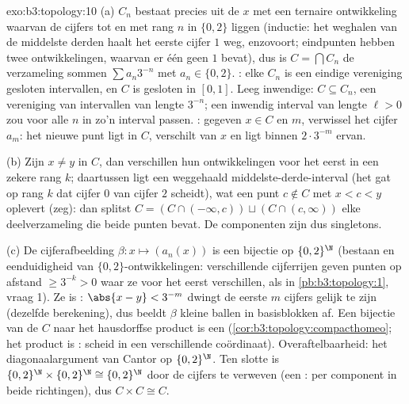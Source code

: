 \begin{solution}{exo:b3:topology:10}
(a) $C_n$ bestaat precies uit de $x$ met een ternaire ontwikkeling
waarvan de cijfers tot en met rang $n$ in $\{0, 2\}$ liggen
(inductie: het weghalen van de middelste derden haalt het eerste
cijfer $1$ weg, enzovoort; eindpunten hebben twee ontwikkelingen,
waarvan er één geen $1$ bevat), dus is $C = \bigcap C_n$ de
verzameling sommen $\sum a_n3^{-n}$ met $a_n \in \{0,2\}$.
: elke $C_n$ is een eindige vereniging gesloten
intervallen, en $C$ is gesloten in $[0,1]$. Leeg inwendige: $C
\subseteq C_n$, een vereniging van intervallen van lengte
$3^{-n}$; een inwendig interval van lengte $\ell > 0$ zou voor
alle $n$ in zo'n interval passen. : gegeven $x \in C$ en
$m$, verwissel het cijfer $a_m$: het nieuwe punt ligt in $C$,
verschilt van $x$ en ligt binnen $2\cdot3^{-m}$ ervan.

(b) Zijn $x \neq y$ in $C$, dan verschillen hun ontwikkelingen
voor het eerst in een zekere rang $k$; daartussen ligt een
weggehaald middelste-derde-interval (het gat op rang $k$ dat
cijfer $0$ van cijfer $2$ scheidt), wat een punt $c \notin C$ met
$x < c < y$ oplevert (zeg): dan splitst $C = (C \cap (-\infty, c))
\sqcup (C \cap (c, \infty))$ elke deelverzameling die beide punten
bevat. De componenten zijn dus singletons.

(c) De cijferafbeelding $\beta\colon x \mapsto (a_n(x))$ is een
bijectie op $\{0,2\}^\N$ (bestaan en eenduidigheid van
$\{0,2\}$-ontwikkelingen: verschillende cijferrijen geven punten
op afstand $\geq 3^{-k} > 0$ waar ze voor het eerst verschillen,
als in \cref{pb:b3:topology:1}, vraag 1). Ze is : $\abs{x -
y} < 3^{-m}$ dwingt de eerste $m$ cijfers gelijk te zijn
(dezelfde berekening), dus beeldt $\beta$ kleine ballen in
basisblokken af. Een  bijectie van de  $C$ naar
het hausdorffse product is een 
(\cref{cor:b3:topology:compacthomeo}; het product is :
scheid in een verschillende coördinaat). Overaftelbaarheid: het
diagonaalargument van Cantor op $\{0,2\}^\N$. Ten slotte is
$\{0,2\}^\N \times \{0,2\}^\N \cong \{0,2\}^\N$ door de cijfers te
verweven (een :  per component in beide
richtingen), dus $C \times C \cong C$.
\end{solution}

